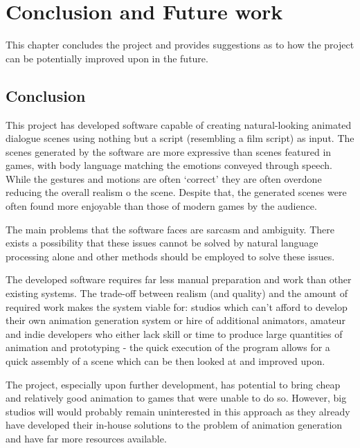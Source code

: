 \chapter{Conclusion and Future work \label{chap:conclusion}}
This chapter concludes the project and provides suggestions as to how the project can be potentially improved upon in the future.

\section{Conclusion}
This project has developed software capable of creating natural-looking animated dialogue scenes using nothing but a script (resembling a film script) as input. The scenes generated by the software are more expressive than scenes featured in games, with body language matching the emotions conveyed through speech. While the gestures and motions are often `correct' they are often overdone reducing the overall realism o the scene. Despite that, the generated scenes were often found more enjoyable than those of modern games by the audience.

The main problems that the software faces are sarcasm and ambiguity. There exists a possibility that these issues cannot be solved by natural language processing alone and other methods should be employed to solve these issues.

The developed software requires far less manual preparation and work than other existing systems. The trade-off between realism (and quality) and the amount of required work makes the system viable for: studios which can't afford to develop their own animation generation system or hire of additional animators, amateur and indie developers who either lack skill or time to produce large quantities of animation and prototyping - the quick execution of the program allows for a quick assembly of a scene which can be then looked at and improved upon.

The project, especially upon further development, has potential to bring cheap and relatively good animation to games that were unable to do so. However, big studios will would probably remain uninterested in this approach as they already have developed their in-house solutions to the problem of animation generation and have far more resources available.


